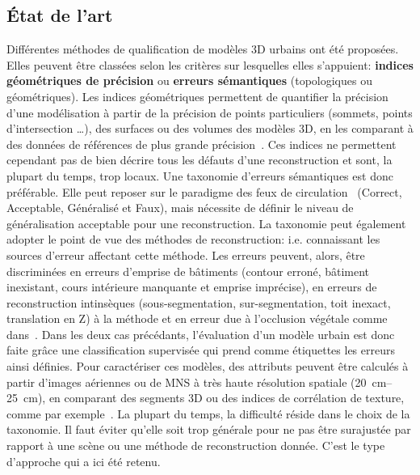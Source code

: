     \subsection*{\'Etat de l'art}
            Différentes méthodes de qualification de modèles 3D urbains ont été proposées.
            Elles peuvent être classées selon les critères sur lesquelles elles s'appuient: \textbf{indices géométriques de précision} ou \textbf{erreurs sémantiques} (topologiques ou géométriques).
            Les indices géométriques permettent de quantifier la précision d'une modélisation à partir de la précision de points particuliers (sommets, points d'intersection \dots), des surfaces ou des volumes des modèles 3D, en les comparant à des données de références de plus grande précision~\parencite{zeng2014multicriteria}.
            Ces indices ne permettent cependant pas de bien décrire tous les défauts d'une reconstruction et sont, la plupart du temps, trop locaux.
            Une taxonomie d'erreurs sémantiques est donc préférable.
            Elle peut reposer sur le paradigme des feux de circulation~\parencite{boudet2006supervised} (Correct, Acceptable, Généralisé et Faux), mais nécessite de définir le niveau de généralisation acceptable pour une reconstruction.
            La taxonomie peut également adopter le point de vue des méthodes de reconstruction: i.e. connaissant les sources d'erreur affectant cette méthode. 
            Les erreurs peuvent, alors, être discriminées en erreurs d'emprise de bâtiments (contour erroné, bâtiment inexistant, cours intérieure manquante et emprise imprécise), en erreurs de reconstruction intinsèques (sous-segmentation, sur-segmentation, toit inexact, translation en Z) à la méthode et en erreur due à l'occlusion végétale comme dans~\parencite{michelin2013quality}.
            Dans les deux cas précédants, l'évaluation d'un modèle urbain est donc faite grâce une classification supervisée qui prend comme étiquettes les erreurs ainsi définies.
            Pour caractériser ces modèles, des attributs peuvent être calculés à partir d'images aériennes ou de MNS à très haute résolution spatiale (\SIrange[locale=FR, range-phrase={à}]{20}{25}{\cm}), en comparant des segments 3D ou des indices de corrélation de texture, comme par exemple~\parencite{boudet2006supervised, michelin2013quality}.
            La plupart du temps, la difficulté réside dans le choix de la taxonomie.
            Il faut éviter qu'elle soit trop générale pour ne pas être surajustée par rapport à une scène ou une méthode de reconstruction donnée.
            C'est le type d'approche qui a ici été retenu.

